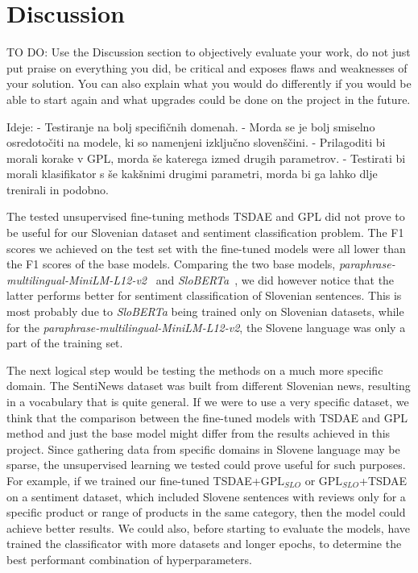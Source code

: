 \documentclass[fleqn,moreauthors,10pt]{ds_report}
\begin{document}



\section*{Discussion}

TO DO:
Use the Discussion section to objectively evaluate your work, do not just put praise on everything you did, be critical and exposes flaws and weaknesses of your solution. You can also explain what you would do differently if you would be able to start again and what upgrades could be done on the project in the future.

Ideje:
- Testiranje na bolj specifičnih domenah.
- Morda se je bolj smiselno osredotočiti na modele, ki so namenjeni izključno slovenščini.
- Prilagoditi bi morali korake v GPL, morda še katerega izmed drugih parametrov.
- Testirati bi morali klasifikator s še kakšnimi drugimi parametri, morda bi ga lahko dlje trenirali in podobno.


The tested unsupervised fine-tuning methods TSDAE and GPL did not prove to be useful for our Slovenian dataset and sentiment classification problem. The F1 scores we achieved on the test set with the fine-tuned models were all lower than the F1 scores of the base models. Comparing the two base models, {\it paraphrase-multilingual-MiniLM-L12-v2}~\cite{reimers-2019-sentence-bert} and {\it SloBERTa}~\cite{sloberta}, we did however notice that the latter performs better for sentiment classification of Slovenian sentences. This is most probably due to {\it SloBERTa} being trained only on Slovenian datasets, while for the {\it paraphrase-multilingual-MiniLM-L12-v2}, the Slovene language was only a part of the training set.

The next logical step would be testing the methods on a much more specific domain. The SentiNews dataset was built from different Slovenian news, resulting in a vocabulary that is quite general. If we were to use a very specific dataset, we think that the comparison between the fine-tuned models with TSDAE and GPL method and just the base model might differ from the results achieved in this project. Since gathering data from specific domains in Slovene language may be sparse, the unsupervised learning we tested could prove useful for such purposes. For example, if we trained our fine-tuned TSDAE+$\text{GPL}_{SLO}$ or $\text{GPL}_{SLO}$+TSDAE on a sentiment dataset, which included Slovene sentences with reviews only for a specific product or range of products in the same category, then the model could achieve better results. We could also, before starting to evaluate the models, have trained the classificator with more datasets and longer epochs, to determine the best performant combination of hyperparameters.
\end{document}
